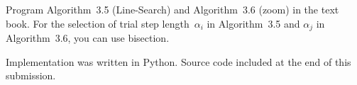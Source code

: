 \begin{problem}
  Program Algorithm~3.5 (Line-Search) and Algorithm~3.6 (zoom) in the text book.  For the selection of trial step length~$\alpha_i$ in Algorithm~3.5 and $\alpha_j$ in Algorithm~3.6, you can use bisection.
  \label{prob:ProgAlg}
\end{problem}

\noindent
Implementation was written in Python.  Source code included at the end of this submission.